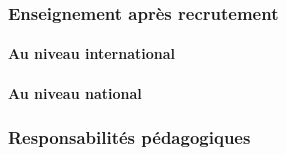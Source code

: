\documentclass[french]{hdrapplication}
\begin{document}
\subsubsection{Enseignement après recrutement}

\paragraph{Au niveau international}

\paragraph{Au niveau national}

\subsubsection{Responsabilités pédagogiques}


\hdrpublicationlist
\end{document}
